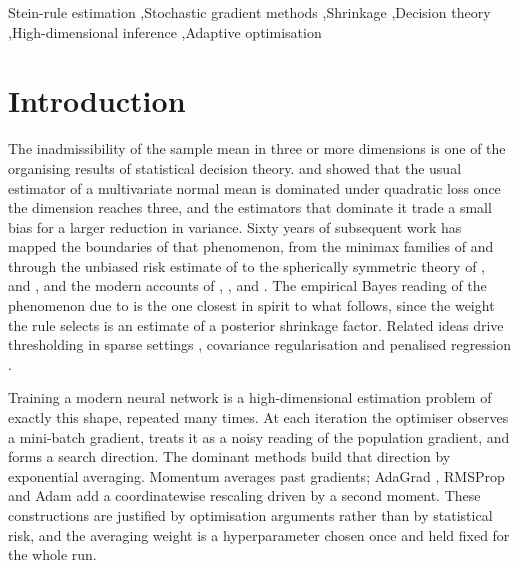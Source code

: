\documentclass[a4paper,fleqn]{cas-sc}
\theoremstyle{plain}
\theoremstyle{definition}
\theoremstyle{remark}
\begin{document}
\begin{keywords}
Stein-rule estimation \sep Stochastic gradient methods \sep Shrinkage \sep Decision theory \sep High-dimensional inference \sep Adaptive optimisation
\end{keywords}

\maketitle


\section{Introduction}
\label{sec:introduction}

The inadmissibility of the sample mean in three or more dimensions is one of the organising results of statistical decision theory. \citet{stein1956} and \citet{james1961} showed that the usual estimator of a multivariate normal mean is dominated under quadratic loss once the dimension reaches three, and the estimators that dominate it trade a small bias for a larger reduction in variance. Sixty years of subsequent work has mapped the boundaries of that phenomenon, from the minimax families of \citet{baranchik1970} and \citet{bock1975} through the unbiased risk estimate of \citet{stein1981} to the spherically symmetric theory of \citet{strawderman1974}, \citet{brandwein1990,brandwein2012} and \citet{cellier1995,cellier1995b}, and the modern accounts of \citet{berger1985}, \citet{lehmann1998}, \citet{fourdrinier2018} and \citet{saleh2006}. The empirical Bayes reading of the phenomenon due to \citet{efronmorris1973,efronmorris1976,efron2012} is the one closest in spirit to what follows, since the weight the rule selects is an estimate of a posterior shrinkage factor. Related ideas drive thresholding in sparse settings \citep{donoho1994}, covariance regularisation \citep{ledoit2004} and penalised regression \citep{saleh2019}.

Training a modern neural network is a high-dimensional estimation problem of exactly this shape, repeated many times. At each iteration the optimiser observes a mini-batch gradient, treats it as a noisy reading of the population gradient, and forms a search direction. The dominant methods build that direction by exponential averaging. Momentum \citep{polyak1964, sutskever2013} averages past gradients; AdaGrad \citep{duchi2011}, RMSProp \citep{tieleman2012} and Adam \citep{kingma2015} add a coordinatewise rescaling driven by a second moment. These constructions are justified by optimisation arguments rather than by statistical risk, and the averaging weight is a hyperparameter chosen once and held fixed for the whole run.
\end{document}
